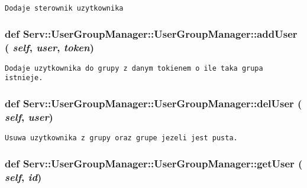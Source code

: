 \footnotesize\begin{verbatim}Dodaje sterownik uzytkownika\end{verbatim}
\normalsize
 \hypertarget{class_serv_1_1_user_group_manager_1_1_user_group_manager_46ee225566738a93c7c036b464a931fb}{
\subsubsection[{addUser}]{\setlength{\rightskip}{0pt plus 5cm}def Serv::UserGroupManager::UserGroupManager::addUser ( {\em self}, \/   {\em user}, \/   {\em token})}}
\label{class_serv_1_1_user_group_manager_1_1_user_group_manager_46ee225566738a93c7c036b464a931fb}




\footnotesize\begin{verbatim}Dodaje uzytkownika do grupy z danym tokienem o ile taka grupa istnieje.\end{verbatim}
\normalsize
 \hypertarget{class_serv_1_1_user_group_manager_1_1_user_group_manager_4b747272c8166d17b9458b3f8c4796f0}{
\subsubsection[{delUser}]{\setlength{\rightskip}{0pt plus 5cm}def Serv::UserGroupManager::UserGroupManager::delUser ( {\em self}, \/   {\em user})}}
\label{class_serv_1_1_user_group_manager_1_1_user_group_manager_4b747272c8166d17b9458b3f8c4796f0}




\footnotesize\begin{verbatim}Usuwa uzytkownika z grupy oraz grupe jezeli jest pusta.\end{verbatim}
\normalsize
 \hypertarget{class_serv_1_1_user_group_manager_1_1_user_group_manager_94bccb5702d504f5b782ba2379aaaab4}{
\subsubsection[{getUser}]{\setlength{\rightskip}{0pt plus 5cm}def Serv::UserGroupManager::UserGroupManager::getUser ( {\em self}, \/   {\em id})}}
\label{class_serv_1_1_user_group_manager_1_1_user_group_manager_94bccb5702d504f5b782ba2379aaaab4}





